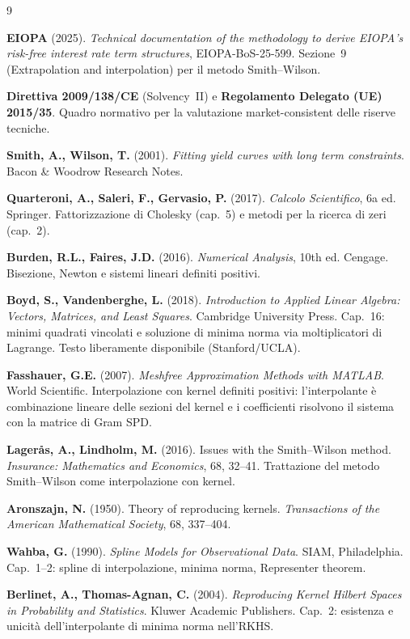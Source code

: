 \documentclass[11pt,a4paper]{article}
\theoremstyle{plain}
\theoremstyle{definition}
\theoremstyle{remark}
\begin{document}
\renewcommand{\refname}{Riferimenti bibliografici}
\begin{thebibliography}{9}

  \textbf{EIOPA} (2025).
  \textit{Technical documentation of the methodology to derive EIOPA's risk-free interest rate
  term structures}, EIOPA-BoS-25-599.
  Sezione~9 (Extrapolation and interpolation) per il metodo Smith--Wilson.

  \textbf{Direttiva 2009/138/CE} (Solvency~II) e
  \textbf{Regolamento Delegato (UE) 2015/35}.
  Quadro normativo per la valutazione market-consistent delle riserve tecniche.

  \textbf{Smith, A., Wilson, T.} (2001).
  \textit{Fitting yield curves with long term constraints}.
  Bacon \& Woodrow Research Notes.

  \textbf{Quarteroni, A., Saleri, F., Gervasio, P.} (2017).
  \textit{Calcolo Scientifico}, 6a ed. Springer.
  Fattorizzazione di Cholesky (cap.~5) e metodi per la ricerca di zeri (cap.~2).

  \textbf{Burden, R.L., Faires, J.D.} (2016).
  \textit{Numerical Analysis}, 10th ed. Cengage.
  Bisezione, Newton e sistemi lineari definiti positivi.

  \textbf{Boyd, S., Vandenberghe, L.} (2018).
  \textit{Introduction to Applied Linear Algebra: Vectors, Matrices, and Least Squares}.
  Cambridge University Press.
  Cap.~16: minimi quadrati vincolati e soluzione di minima norma via moltiplicatori di
  Lagrange. Testo liberamente disponibile (Stanford/UCLA).

  \textbf{Fasshauer, G.E.} (2007).
  \textit{Meshfree Approximation Methods with MATLAB}. World Scientific.
  Interpolazione con kernel definiti positivi: l'interpolante \`e combinazione lineare delle
  sezioni del kernel e i coefficienti risolvono il sistema con la matrice di Gram SPD.

  \textbf{Lager\aa s, A., Lindholm, M.} (2016).
  Issues with the Smith--Wilson method.
  \textit{Insurance: Mathematics and Economics}, 68, 32--41.
  Trattazione del metodo Smith--Wilson come interpolazione con kernel.

  \textbf{Aronszajn, N.} (1950).
  Theory of reproducing kernels.
  \textit{Transactions of the American Mathematical Society}, 68, 337--404.

  \textbf{Wahba, G.} (1990).
  \textit{Spline Models for Observational Data}. SIAM, Philadelphia.
  Cap.~1--2: spline di interpolazione, minima norma, Representer theorem.

  \textbf{Berlinet, A., Thomas-Agnan, C.} (2004).
  \textit{Reproducing Kernel Hilbert Spaces in Probability and Statistics}.
  Kluwer Academic Publishers.
  Cap.~2: esistenza e unicità dell'interpolante di minima norma nell'RKHS.

\end{thebibliography}
\end{document}
